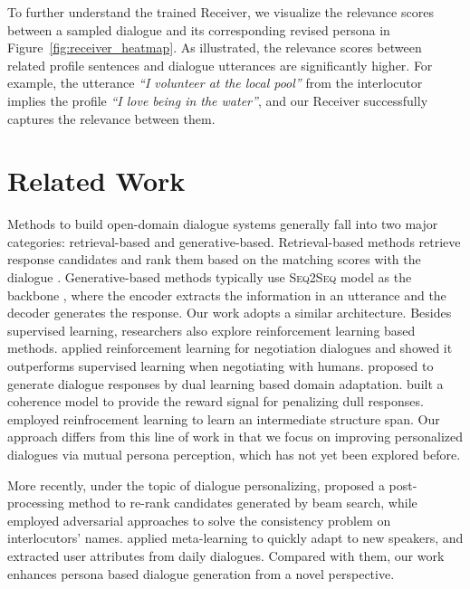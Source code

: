 \documentclass[11pt,a4paper]{article}
\begin{document}
To further understand the trained Receiver, we visualize the relevance scores between a sampled dialogue and its corresponding revised persona in Figure~\ref{fig:receiver_heatmap}. As illustrated, the relevance scores between related profile sentences and dialogue utterances are significantly higher. For example, the utterance \textit{``I volunteer at the local pool''} from the interlocutor implies the profile \textit{``I love being in the water''}, and our Receiver successfully captures the relevance between them.


\section{Related Work}

Methods to build open-domain dialogue systems generally fall into two major categories: retrieval-based and generative-based. Retrieval-based methods retrieve response candidates and rank them based on the matching scores with the dialogue \cite{sordonineural2015,wu2017sequential,gu2019dually}. Generative-based methods typically use \textsc{Seq2Seq} model as the backbone \cite{sutskever2014sequence,Bahdanau2014NeuralMT,serban2017hierarchical,wolf2019transfertransfo},
where the encoder extracts the information in an utterance and the decoder generates the response. Our work adopts a similar architecture. Besides supervised learning, researchers also explore reinforcement learning based methods. \citet{lewis2017deal} applied reinforcement learning for negotiation dialogues and showed it outperforms supervised learning when negotiating with humans. \citet{yang2018personalized} proposed to generate dialogue responses by dual learning based domain adaptation. \citet{zhang2018reinforcing} built a coherence model to provide the reward signal for penalizing dull responses. \citet{liu-etal-2019-split} employed reinfrocement learning to learn an intermediate structure span. Our approach differs from this line of work in that we focus on improving personalized dialogues via mutual persona perception, which has not yet been explored before. 

More recently, under the topic of dialogue personalizing, \citet{zemlyanskiy2018aiming} proposed a post-processing method to re-rank candidates generated by beam search, while \citet{moradversarial} employed adversarial approaches to solve the consistency problem on interlocutors' names. \citet{madotto2019personalizing} applied meta-learning to quickly adapt to new speakers, and \citet{tigunova2019listening} extracted user attributes from daily dialogues. Compared with them, our work enhances persona based dialogue generation from a novel perspective. 
\end{document}
